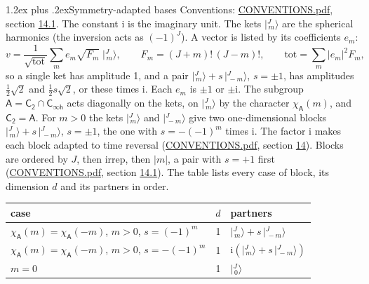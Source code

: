 \documentclass[10pt,a4paper]{article}
\makeatletter
\renewcommand\section{\@startsection{section}{1}{\z@}{-3ex plus -1ex minus -.2ex}%
  {1.2ex plus .2ex}{\normalfont\large\sffamily\bfseries\color{parttitle}}}
\numberwithin{equation}{section}
\newcommand{\grp}[1]{\mathsf{#1}}
\newcommand{\iunit}{\mathrm{i}}
\newcommand{\chiA}{\chi_{\grp{A}}}
\newcommand{\jm}[2]{\bigl\lvert{}^{#1}_{\,#2}\bigr\rangle}
\makeatother
\begin{document}
\section{Symmetry-adapted bases}\label{s:bases}
Conventions: \href{../../CONVENTIONS.pdf}{CONVENTIONS.pdf}, section \href{../../CONVENTIONS.pdf\#conv.14.1}{14.1}.
The constant $\iunit$ is the imaginary unit.
\leavevmode\label{n:index.m}\label{n:vector.ket}The kets $\jm{J}{m}$ are the spherical harmonics (the inversion acts as $(-1)^J$). \label{n:index.ketcoefficient}\label{n:vector.basis.symmetry}\label{n:index.ketweight}\label{n:index.total}A vector is listed by its coefficients $e_m$:
\begin{equation}\label{e:ket}v = \frac{1}{\sqrt{\mathrm{tot}}}\sum_m e_m\sqrt{F_m}\;\jm{J}{m},\qquad F_m = (J+m)!\,(J-m)!,\qquad \mathrm{tot} = \sum_m |e_m|^2F_m,\end{equation}
\leavevmode\label{n:index.pair.sign}so a single ket has amplitude 1, and a pair $\jm{J}{m} + s\,\jm{J}{-m}$, $s = \pm1$, has amplitudes $\tfrac{1}{2}\sqrt{2}$ and $\tfrac{1}{2}s\sqrt{2}$, or these times $\iunit$. Each $e_m$ is $\pm1$ or $\pm\iunit$.
\leavevmode\label{n:group.A}\label{n:function.character.abelian}The subgroup $\grp{A} = \grp{C_{2}}\cap\grp{C_{\infty h}}$ acts diagonally on the kets, on $\jm{J}{m}$ by the character $\chiA(m)$, and $\grp{C_{2}} = \grp{A}$. For $m > 0$ the kets $\jm{J}{m}$ and $\jm{J}{-m}$ give two one-dimensional blocks $\jm{J}{m} + s\,\jm{J}{-m}$, $s = \pm1$, the one with $s = -(-1)^m$ times $\iunit$. The factor $\iunit$ makes each block adapted to time reversal (\href{../../CONVENTIONS.pdf}{CONVENTIONS.pdf}, section \href{../../CONVENTIONS.pdf\#conv.14}{14}). Blocks are ordered by $J$, then irrep, then $|m|$, a pair with $s = +1$ first (\href{../../CONVENTIONS.pdf}{CONVENTIONS.pdf}, section \href{../../CONVENTIONS.pdf\#conv.14.1}{14.1}).
\leavevmode\label{n:head.case}\label{n:head.partners}The table lists every case of block, its dimension $d$ and its partners in order.
\begin{center}\begin{tabular}{@{}lrl@{}}\toprule
case & $d$ & partners\\\midrule
$\chiA(m) = \chiA(-m)$, $m > 0$, $s = (-1)^m$ & 1 & $\jm{J}{m} + s\,\jm{J}{-m}$\\
$\chiA(m) = \chiA(-m)$, $m > 0$, $s = -(-1)^m$ & 1 & $\iunit(\jm{J}{m} + s\,\jm{J}{-m})$\\
$m = 0$ & 1 & $\jm{J}{0}$\\
\bottomrule\end{tabular}\end{center}
\end{document}
